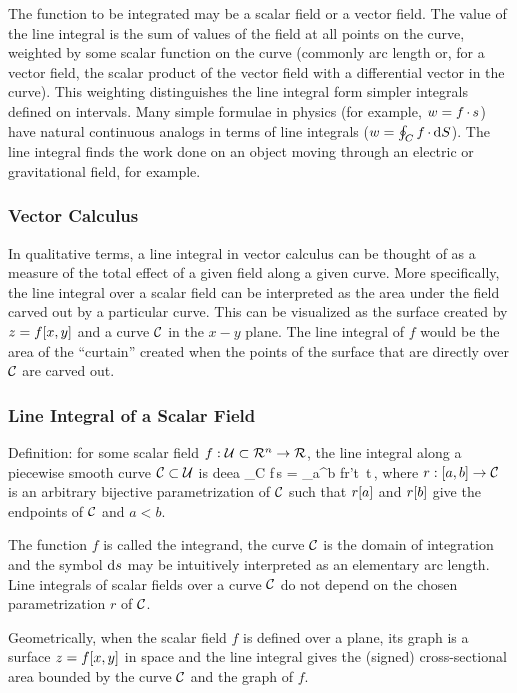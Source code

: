 The function to be integrated may be a scalar field or a vector field. The value of the line integral is the sum of values of the field at all points on the curve, weighted by some scalar function on the curve (commonly arc length or, for a vector field, the scalar product of the vector field with a differential vector in the curve). This weighting distinguishes the line integral form simpler integrals defined on intervals. Many simple formulae in physics (for example, $w = f\operatorname{\cdot} s$) have natural continuous analogs in terms of line integrals ($w = \oint_C f\operatorname{\cdot}\text{d} S$). The line integral finds the work done on an object moving through an electric or gravitational field, for example.


\subsubsection{Vector Calculus}
In qualitative terms, a line integral in vector calculus can be thought of as a measure of the total effect of a given field along a given curve. More specifically, the line integral over a scalar field can be interpreted as the area under the field carved out by a particular curve. This can be visualized as the surface created by $z = f\!\left[{x,y}\right]$ and a curve $\mathcal{C}$ in the $x-y$ plane. The line integral of $f$ would be the area of the ``curtain'' created when the points of the surface that are directly over $\mathcal{C}$ are carved out.


\subsubsection{Line Integral of a Scalar Field}
Definition: for some scalar field ${f}:{\mathcal{U}\subset\mathcal{R}^{n}}\to{\mathcal{R}}$, the line integral along a piecewise smooth curve $\mathcal{C}\subset\mathcal{U}$ is deea
\beq
\int_C f\,\dx s = \int_a^b f\vert r'\vat t \vert\,\dx t\,,
\eeq
where ${r}:{[a,b]}\to{\mathcal{C}}$ is an arbitrary bijective parametrization of $\mathcal{C}$ such that $r\!\left[{a}\right]$ and $r\!\left[{b}\right]$ give the endpoints of $\mathcal{C}$ and $a < b$.

The function $f$ is called the integrand, the curve $\mathcal{C}$ is the domain of integration and the symbol $\text{d} s$ may be intuitively interpreted as an elementary arc length. Line integrals of scalar fields over a curve $\mathcal{C}$ do not depend on the chosen parametrization $r$ of $\mathcal{C}$.

Geometrically, when the scalar field $f$ is defined over a plane, its graph is a surface $z = f\!\left[{x,y}\right]$ in space and the line integral gives the (signed) cross-sectional area bounded by the curve $\mathcal{C}$ and the graph of $f$.


